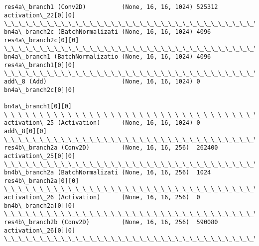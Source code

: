 \documentclass[11pt]{article}
\begin{document}
\begin{Verbatim}[commandchars=\\\{\}]
res4a\_branch1 (Conv2D)          (None, 16, 16, 1024) 525312      activation\_22[0][0]              
\_\_\_\_\_\_\_\_\_\_\_\_\_\_\_\_\_\_\_\_\_\_\_\_\_\_\_\_\_\_\_\_\_\_\_\_\_\_\_\_\_\_\_\_\_\_\_\_\_\_\_\_\_\_\_\_\_\_\_\_\_\_\_\_\_\_\_\_\_\_\_\_\_\_\_\_\_\_\_\_\_\_\_\_\_\_\_\_\_\_\_\_\_\_\_\_\_\_
bn4a\_branch2c (BatchNormalizati (None, 16, 16, 1024) 4096        res4a\_branch2c[0][0]             
\_\_\_\_\_\_\_\_\_\_\_\_\_\_\_\_\_\_\_\_\_\_\_\_\_\_\_\_\_\_\_\_\_\_\_\_\_\_\_\_\_\_\_\_\_\_\_\_\_\_\_\_\_\_\_\_\_\_\_\_\_\_\_\_\_\_\_\_\_\_\_\_\_\_\_\_\_\_\_\_\_\_\_\_\_\_\_\_\_\_\_\_\_\_\_\_\_\_
bn4a\_branch1 (BatchNormalizatio (None, 16, 16, 1024) 4096        res4a\_branch1[0][0]              
\_\_\_\_\_\_\_\_\_\_\_\_\_\_\_\_\_\_\_\_\_\_\_\_\_\_\_\_\_\_\_\_\_\_\_\_\_\_\_\_\_\_\_\_\_\_\_\_\_\_\_\_\_\_\_\_\_\_\_\_\_\_\_\_\_\_\_\_\_\_\_\_\_\_\_\_\_\_\_\_\_\_\_\_\_\_\_\_\_\_\_\_\_\_\_\_\_\_
add\_8 (Add)                     (None, 16, 16, 1024) 0           bn4a\_branch2c[0][0]              
                                                                 bn4a\_branch1[0][0]               
\_\_\_\_\_\_\_\_\_\_\_\_\_\_\_\_\_\_\_\_\_\_\_\_\_\_\_\_\_\_\_\_\_\_\_\_\_\_\_\_\_\_\_\_\_\_\_\_\_\_\_\_\_\_\_\_\_\_\_\_\_\_\_\_\_\_\_\_\_\_\_\_\_\_\_\_\_\_\_\_\_\_\_\_\_\_\_\_\_\_\_\_\_\_\_\_\_\_
activation\_25 (Activation)      (None, 16, 16, 1024) 0           add\_8[0][0]                      
\_\_\_\_\_\_\_\_\_\_\_\_\_\_\_\_\_\_\_\_\_\_\_\_\_\_\_\_\_\_\_\_\_\_\_\_\_\_\_\_\_\_\_\_\_\_\_\_\_\_\_\_\_\_\_\_\_\_\_\_\_\_\_\_\_\_\_\_\_\_\_\_\_\_\_\_\_\_\_\_\_\_\_\_\_\_\_\_\_\_\_\_\_\_\_\_\_\_
res4b\_branch2a (Conv2D)         (None, 16, 16, 256)  262400      activation\_25[0][0]              
\_\_\_\_\_\_\_\_\_\_\_\_\_\_\_\_\_\_\_\_\_\_\_\_\_\_\_\_\_\_\_\_\_\_\_\_\_\_\_\_\_\_\_\_\_\_\_\_\_\_\_\_\_\_\_\_\_\_\_\_\_\_\_\_\_\_\_\_\_\_\_\_\_\_\_\_\_\_\_\_\_\_\_\_\_\_\_\_\_\_\_\_\_\_\_\_\_\_
bn4b\_branch2a (BatchNormalizati (None, 16, 16, 256)  1024        res4b\_branch2a[0][0]             
\_\_\_\_\_\_\_\_\_\_\_\_\_\_\_\_\_\_\_\_\_\_\_\_\_\_\_\_\_\_\_\_\_\_\_\_\_\_\_\_\_\_\_\_\_\_\_\_\_\_\_\_\_\_\_\_\_\_\_\_\_\_\_\_\_\_\_\_\_\_\_\_\_\_\_\_\_\_\_\_\_\_\_\_\_\_\_\_\_\_\_\_\_\_\_\_\_\_
activation\_26 (Activation)      (None, 16, 16, 256)  0           bn4b\_branch2a[0][0]              
\_\_\_\_\_\_\_\_\_\_\_\_\_\_\_\_\_\_\_\_\_\_\_\_\_\_\_\_\_\_\_\_\_\_\_\_\_\_\_\_\_\_\_\_\_\_\_\_\_\_\_\_\_\_\_\_\_\_\_\_\_\_\_\_\_\_\_\_\_\_\_\_\_\_\_\_\_\_\_\_\_\_\_\_\_\_\_\_\_\_\_\_\_\_\_\_\_\_
res4b\_branch2b (Conv2D)         (None, 16, 16, 256)  590080      activation\_26[0][0]              
\_\_\_\_\_\_\_\_\_\_\_\_\_\_\_\_\_\_\_\_\_\_\_\_\_\_\_\_\_\_\_\_\_\_\_\_\_\_\_\_\_\_\_\_\_\_\_\_\_\_\_\_\_\_\_\_\_\_\_\_\_\_\_\_\_\_\_\_\_\_\_\_\_\_\_\_\_\_\_\_\_\_\_\_\_\_\_\_\_\_\_\_\_\_\_\_\_\_

\end{Verbatim}
\end{document}
